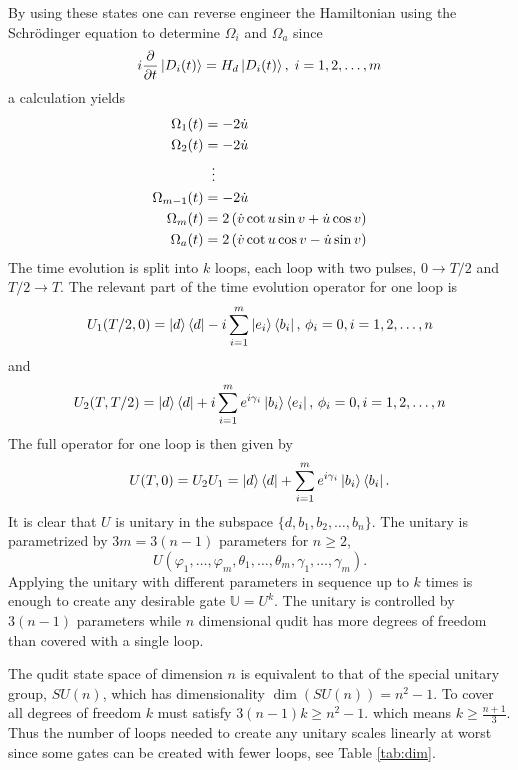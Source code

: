 By using these states one can reverse engineer the Hamiltonian using the Schrödinger equation to determine $\Omega_i$ and $\Omega_a$ since 
\begin{equation}
i\pdv{}{t}\ket{D_i(t)} = H_d\ket{D_i(t)},\; i = 1,2,\dots,m
\end{equation}
a calculation yields
\begin{equation}
\begin{aligned}
\Omega_1(t) &= -2\dot{u}
\\ 
\Omega_2(t) &= -2\dot{u}
\\
&\hspace{2mm}\vdots
\\
\Omega_{m-1}(t) &= -2\dot{u}
\\
\Omega_m(t) &= 2\left(\dot{v}\cot u\sin v + \dot{u}\cos v \right)
\\
\Omega_a(t) &= 2\left(\dot{v}\cot u\cos v - \dot{u}\sin v \right)
\end{aligned}
\end{equation}
The time evolution is split into $k$ loops, each loop with two pulses, $0 \longrightarrow T/2$ and $T/2 \longrightarrow T$. The relevant part of the time evolution operator for one loop is  
\begin{equation}
U_1(T/2,0) = \ket{d}\bra{d} -i\sum_{i = 1}^m \ket{e_i}\bra{b_i},\, \phi_i = 0, i = 1,2,\dots,n
\end{equation} and 
\begin{equation}
U_2(T,T/2) = \ket{d}\bra{d} + i\sum_{i = 1}^m e^{i\gamma_i}\ket{b_i}\bra{e_i},\, \phi_i = 0, i = 1,2,\dots,n
\end{equation}
The full operator for one loop is then given by 
\begin{equation}
U(T,0) = U_2U_1 = \ket{d}\bra{d} + \sum_{i = 1}^{m}e^{i\gamma_i}\ket{b_i}\bra{b_i}.
\end{equation}
It is clear that $U$ is unitary in the subspace $\{d,b_1,b_2,\dots, b_n\}.$ The unitary is parametrized by $3m = 3(n-1)$ parameters for $ n\geq 2$,
\begin{equation}
U(\varphi_1,\dots,\varphi_m,\theta_1,\dots,\theta_m,\gamma_1,\dots,\gamma_m).
\end{equation} 
Applying the unitary with different parameters in sequence up to $k$ times is enough to create any desirable gate $\mathbb{U} = U^k$. The unitary is controlled by $3(n-1)$ parameters while $n$ dimensional qudit has more degrees of freedom than covered with a single loop.

The qudit state space of dimension $n$ is equivalent to that of the special unitary group, $SU(n)$, which has dimensionality $\dim(SU(n)) = n^2 -1$. To cover all degrees of freedom $k$ must satisfy $3(n-1)k \geq n^2 -1$.
which means $k \geq \frac{n+1}{3}$. Thus the number of loops needed to create any unitary scales linearly at worst since some gates can be created with fewer loops, see Table \ref{tab:dim}. 

